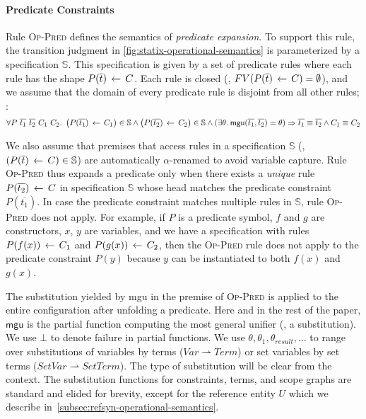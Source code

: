 \paragraph{Predicate Constraints}
Rule \textsc{Op-Pred} defines the semantics of \emph{predicate expansion}.
To support this rule, the transition judgment in \cref{fig:statix-operational-semantics} is parameterized by a specification $\mathbb{S}$.
This specification is given by a set of predicate rules where each rule has the shape $P(\overline{t}) \, \leftarrow\,{} C$.
Each rule is closed (\ie, $FV(P(\overline{t}) \, \leftarrow\,{} C) = \emptyset$), and we assume that the domain of every predicate rule is disjoint from all other rules; \ie:
%
\[
    \forall P\ \overline{t_1}\ \overline{t_2}\ C_1\ C_2.
    \ \left( P(\overline{t_1}) \rTurnstile{} C_1 \right) \in \mathbb{S} \wedge
     \left( P(\overline{t_2}) \rTurnstile{} C_2 \right) \in \mathbb{S} \wedge
     (\exists \theta.\: \mathsf{mgu}(\overline{t_1}, \overline{t_2}) = \theta) \Rightarrow
     \overline{t_1} \equiv \overline{t_2} \wedge C_1 \equiv C_2
\]%

\noindent
We also assume that premises that access rules in a specification $\mathbb{S}$ (\eg, $(P(\overline{t}) \, \leftarrow\,{} C) \in \mathbb{S}$) are automatically $\alpha$-renamed to avoid variable capture.
Rule \textsc{Op-Pred} thus expands a predicate only when there exists a \emph{unique} rule $P(\overline{t_2}) \, \leftarrow\, C$ in specification $\mathbb{S}$ whose head matches the predicate constraint $P(\overline{t_1})$.
In case the predicate constraint matches multiple rules in $\mathbb{S}$, rule \textsc{Op-Pred} does not apply.
For example, if $P$ is a predicate symbol, $f$ and $g$ are constructors, $x$, $y$ are variables, and we have a specification with rules $P(f(x)) \, \leftarrow\, C_1$ and $P(g(x)) \, \leftarrow\, C_2$,
then the \textsc{Op-Pred} rule does not apply to the predicate constraint $P(y)$ because $y$ can be instantiated to both $f(x)$ and $g(x)$.

The substitution yielded by \textsf{mgu} in the premise of \textsc{Op-Pred} is applied to the entire configuration after unfolding a predicate.
Here and in the rest of the paper, $\mathsf{mgu}$ is the partial function computing the most general unifier (\ie, a substitution).
We use $\bot$ to denote failure in partial functions.
We use $\theta,\theta_1,\theta_{result},\ldots$ to range over substitutions of variables by terms ($\mathit{Var} \rightharpoonup \mathit{Term}$) or set variables by set terms ($\mathit{SetVar} \rightharpoonup \mathit{SetTerm}$).
The type of substitution will be clear from the context.
The substitution functions for constraints, terms, and scope graphs are standard and elided for brevity, except for the reference entity $U$ which we describe in~\cref{subsec:refsyn-operational-semantics}.

